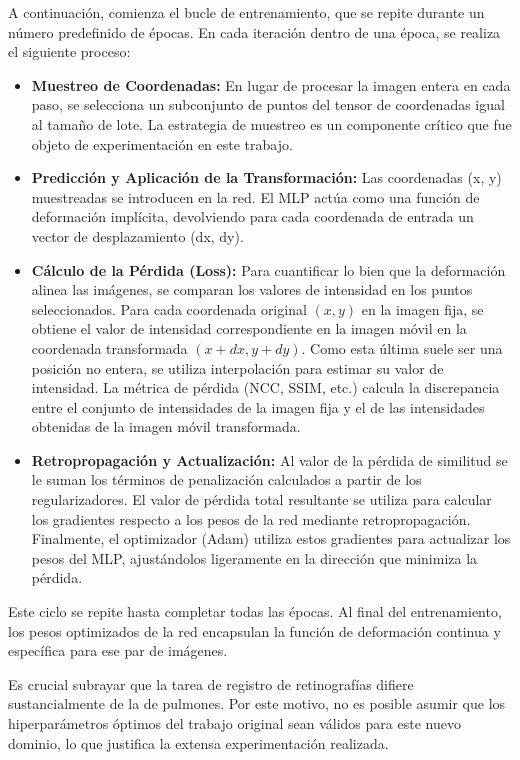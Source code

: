 A continuación, comienza el bucle de entrenamiento, que se repite durante un número predefinido de épocas. En cada iteración dentro de una época, se realiza el siguiente proceso:
\begin{itemize}
    \item \textbf{Muestreo de Coordenadas:} En lugar de procesar la imagen entera en cada paso, se selecciona un subconjunto de puntos del tensor de coordenadas igual al tamaño de lote. La estrategia de muestreo es un componente crítico que fue objeto de experimentación en este trabajo.

    \item \textbf{Predicción y Aplicación de la Transformación:} Las coordenadas (x, y) muestreadas se introducen en la red. El MLP actúa como una función de deformación implícita, devolviendo para cada coordenada de entrada un vector de desplazamiento (dx, dy).

    \item \textbf{Cálculo de la Pérdida (Loss):} Para cuantificar lo bien que la deformación alinea las imágenes, se comparan los valores de intensidad en los puntos seleccionados. Para cada coordenada original $(x,y)$ en la imagen fija, se obtiene el valor de intensidad correspondiente en la imagen móvil en la coordenada transformada $(x + dx, y + dy)$. Como esta última suele ser una posición no entera, se utiliza interpolación para estimar su valor de intensidad. La métrica de pérdida (NCC, SSIM, etc.) calcula la discrepancia entre el conjunto de intensidades de la imagen fija y el de las intensidades obtenidas de la imagen móvil transformada.

    \item \textbf{Retropropagación y Actualización:} Al valor de la pérdida de similitud se le suman los términos de penalización calculados a partir de los regularizadores. El valor de pérdida total resultante se utiliza para calcular los gradientes respecto a los pesos de la red mediante retropropagación. Finalmente, el optimizador (Adam) utiliza estos gradientes para actualizar los pesos del MLP, ajustándolos ligeramente en la dirección que minimiza la pérdida.
\end{itemize}

Este ciclo se repite hasta completar todas las épocas. Al final del entrenamiento, los pesos optimizados de la red encapsulan la función de deformación continua y específica para ese par de imágenes.

Es crucial subrayar que la tarea de registro de retinografías difiere sustancialmente de la de pulmones. Por este motivo, no es posible asumir que los hiperparámetros óptimos del trabajo original sean válidos para este nuevo dominio, lo que justifica la extensa experimentación realizada.

